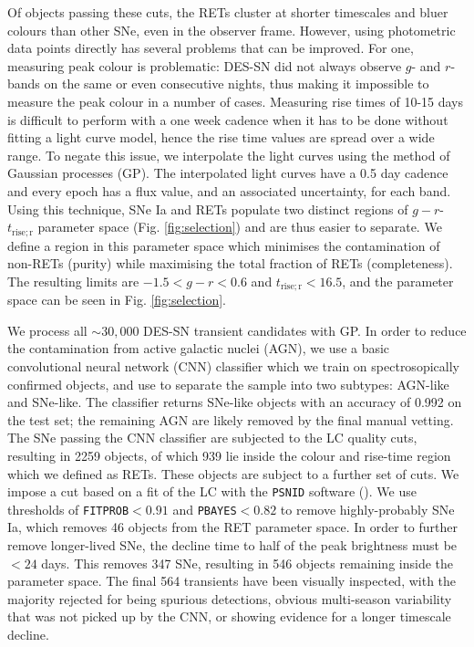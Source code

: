 \documentclass[fleqn,usenatbib,]{mnras}
\begin{document}
Of objects passing these cuts, the RETs cluster at shorter timescales and bluer colours than other SNe, even in the observer frame. However, using photometric data points directly has several problems that can be improved. For one, measuring peak colour is problematic: DES-SN did not always observe $g$- and $r$-bands on the same or even consecutive nights, thus making it impossible to measure the peak colour in a number of cases. Measuring rise times of 10-15 days is difficult to perform with a one week cadence when it has to be done without fitting a light curve model, hence the rise time values are spread over a wide range. To negate this issue, we interpolate the light curves using the method of Gaussian processes (GP). The interpolated light curves have a 0.5 day cadence and every epoch has a flux value, and an associated uncertainty, for each band. Using this technique, SNe Ia and RETs populate two distinct regions of $g-r$-$t_{\mathrm{rise; r}}$ parameter space (Fig. \ref{fig:selection}) and are thus easier to separate. We define a region in this parameter space which minimises the contamination of non-RETs (purity) while maximising the total fraction of RETs (completeness). The resulting limits are $-1.5 < g-r < 0.6 $ and $t_{\mathrm{rise; r}} <16.5$, and the parameter space can be seen in Fig. \ref{fig:selection}.

We process all $\sim 30,000$ DES-SN transient candidates with GP. In order to reduce the contamination from active galactic nuclei (AGN), we use a basic convolutional neural network (CNN) classifier which we train on spectrosopically confirmed objects, and use to separate the sample into two subtypes: AGN-like and SNe-like. The classifier returns SNe-like objects with an accuracy of 0.992 on the test set; the remaining AGN are likely removed by the final manual vetting.
The SNe passing the CNN classifier are subjected to the LC quality cuts, resulting in 2259 objects, of which 939 lie inside the colour and rise-time region which we defined as RETs. These objects are subject to a further set of cuts. We impose a cut based on a fit of the LC with the \texttt{PSNID} software (\citet{Sako2008}). We use thresholds of \texttt{FITPROB}$<0.91$ and \texttt{PBAYES}$<0.82$ to remove highly-probably SNe Ia, which removes 46 objects from the RET parameter space. In order to further remove longer-lived SNe, the decline time to half of the peak brightness must be $<24$ days. This removes 347 SNe, resulting in 546 objects remaining inside the parameter space. The final 564 transients have been visually inspected, with the majority rejected for being spurious detections, obvious multi-season variability that was not picked up by the CNN, or showing evidence for a longer timescale decline. 
\end{document}
